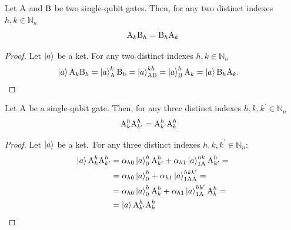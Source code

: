 \documentclass[sigconf,natbib=false]{acmart}
\begin{document}
	\begin{proposition}
		Let $\text{A}$ and $\text{B}$ be two single-qubit gates.
		Then, for any  two  distinct indexes $h,k \in \mathbb{N}_n$
		\begin{equation}
			\label{eq:conmutacion-qubits}
			\text{A}_k\text{B}_{h} = \text{B}_{h}\text{A}_k
		\end{equation}

	\end{proposition}
	\begin{proof}
		Let $\ket{a}$ be a ket.
		For any   two distinct indexes $h,k \in \mathbb{N}_n$
		\begin{align*}
			\ket{a}\text{A}_k\text{B}_{h}
			&=\ket{a}^{k}_{\text{A}}\text{B}_{h}=\ket{a}^{kh}_{\text{AB}}=\ket{a}^{h}_{\text{B}}\text{A}_{k}=\ket{a}\text{B}_{h}\text{A}_k.
		\end{align*}
	\end{proof}

	\begin{proposition}
		Let $\text{A}$ be a single-qubit gate.
		Then, for any  three distinct indexes $h,k,k^\prime \in \mathbb{N}_n$
		\begin{align}
			\text{A}^{h}_{k}\text{A}^{h}_{k^\prime} &= \text{A}^{h}_{k^\prime}\text{A}^{h}_{k}
		\end{align}
	\end{proposition}
	
	\begin{proof}
		Let $\ket{a}$ be a ket.\ For any three distinct  indexes $h,k,k^\prime \in \mathbb{N}_n$:
		\begin{align*}
			\ket{a}\text{A}^{h}_{k}\text{A}^{h}_{k^\prime}
			&=\alpha_{h0}\ket{a}^{h}_{0}\text{A}^{h}_{k^\prime}+\alpha_{h1}\ket{a}^{hk}_{1\text{A}}\text{A}^{h}_{k^\prime}=\\
			&=\alpha_{h0}\ket{a}^{h}_{0}+\alpha_{h1}\ket{a}^{hkk^\prime}_{1\text{AA}}=\\
			&=\alpha_{h0}\ket{a}^{h}_{0}\text{A}^{h}_{k}+\alpha_{h1}\ket{a}^{hk^\prime}_{1\text{A}}\text{A}^{h}_{k}=\\
			&=\ket{a}\text{A}^{h}_{k^\prime}\text{A}^{h}_{k}
		\end{align*}
	\end{proof}
\end{document}
